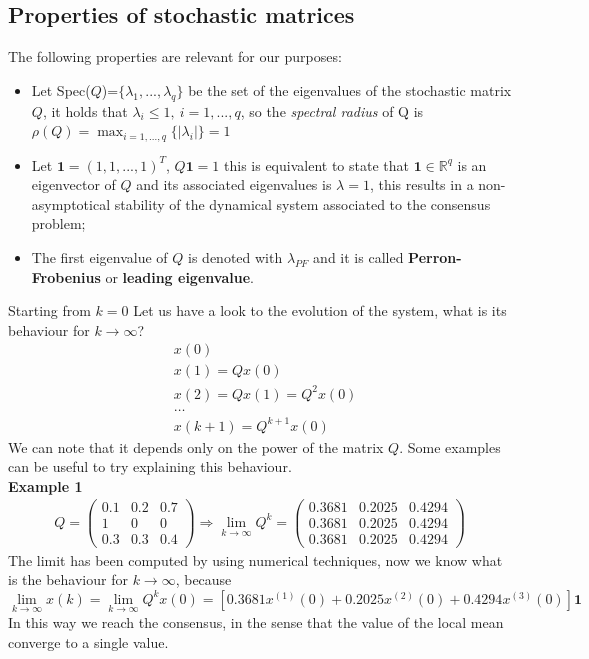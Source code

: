 \subsection{Properties of stochastic matrices}
The following properties are relevant for our purposes:
\begin{itemize}
\item Let Spec($Q$)=$\{\lambda_1, ..., \lambda_q\}$ be the set of the eigenvalues of the stochastic matrix $Q$, it holds that $\lambda_i \le 1, \ i=1,...,q$, so the \textit{spectral radius} of Q is $\rho(Q)=\max_{i=1,...,q}\{\vert\lambda_i \vert\}=1$
\item Let $\mathbf{1}=(1,1,...,1)^T$, $Q\mathbf{1}=1$ this is equivalent to state that $\mathbf{1}\in\mathbb{R}^{q}$ is an eigenvector of $Q$ and its associated eigenvalues is $\lambda=1$, this results in a non-asymptotical stability of the dynamical system associated to the consensus problem;
\item The first eigenvalue of $Q$ is denoted with $\lambda_{PF}$ and it is called \textbf{Perron-Frobenius} or \textbf{leading eigenvalue}.
\end{itemize}

\noindent
Starting from  $k=0$ Let us have a look to the evolution of the system, what is its behaviour for $k\to\infty$? 
\begin{align*}
    &x(0)\\
    &x(1)=Qx(0)\\
    &x(2)=Qx(1)=Q^2x(0)\\
    &\dots\\
    &x(k+1)=Q^{k+1} x(0)
\end{align*}
We can note that  it depends only on the power of the matrix $Q$. Some examples can be useful to try explaining this behaviour.\\

\noindent
{\color{red}\textbf{Example 1}}
\begin{align*}
    Q=\begin{pmatrix}
        0.1&0.2&0.7\\1&0&0\\0.3&0.3&0.4
    \end{pmatrix} \Longrightarrow 
    \lim_{k\to\infty} Q^k=\begin{pmatrix}
        0.3681&0.2025&0.4294\\
        0.3681&0.2025&0.4294\\
        0.3681&0.2025&0.4294
    \end{pmatrix}
\end{align*}
The limit has been computed by using numerical techniques, now we know what is the behaviour for $k\to\infty$, because
\begin{equation*}
    \lim_{k\to\infty} x(k)=\lim_{k\to\infty} Q^kx(0) = [0.3681x^{(1)}(0)+0.2025x^{(2)}(0)+0.4294x^{(3)}(0)] \mathbf{1}
\end{equation*}
In this way we reach the consensus, in the sense that the value of the local mean converge to a single value.\\

